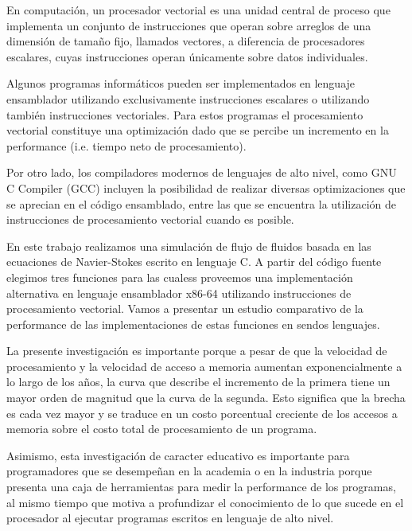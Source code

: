 En computación, un procesador vectorial es una unidad central de proceso que implementa un conjunto de instrucciones que operan sobre arreglos de una dimensión de tamaño fijo, llamados vectores, a diferencia de procesadores escalares, cuyas instrucciones operan únicamente sobre datos individuales.
\par Algunos programas informáticos pueden ser implementados en lenguaje ensamblador utilizando exclusivamente instrucciones escalares o utilizando también instrucciones vectoriales. Para estos programas el procesamiento vectorial constituye una optimización dado que se percibe un incremento en la performance (i.e. tiempo neto de procesamiento).
\par Por otro lado, los compiladores modernos de lenguajes de alto nivel, como GNU C Compiler (GCC) incluyen la posibilidad de realizar diversas optimizaciones que se aprecian en el código ensamblado, entre las que se encuentra la utilización de instrucciones de procesamiento vectorial cuando es posible.
\par En este trabajo realizamos una simulación de flujo de fluidos basada en las ecuaciones de Navier-Stokes escrito en lenguaje C. A partir del código fuente elegimos tres funciones para las cualess proveemos una implementación alternativa en lenguaje ensamblador x86-64 utilizando instrucciones de procesamiento vectorial. Vamos a presentar un estudio comparativo de la performance de las implementaciones de estas funciones en sendos lenguajes.
\par La presente investigación es importante porque a pesar de que la velocidad de procesamiento y la velocidad de acceso a memoria aumentan exponencialmente a lo largo de los años, la curva que describe el incremento de la primera tiene un mayor orden de magnitud que la curva de la segunda. Esto significa que la brecha es cada vez mayor y se traduce en un costo porcentual creciente de los accesos a memoria sobre el costo total de procesamiento de un programa.
\par Asimismo, esta investigación de caracter educativo es importante para programadores que se desempeñan en la academia o en la industria porque presenta una caja de herramientas para medir la performance de los programas, al mismo tiempo que motiva a profundizar el conocimiento de lo que sucede en el procesador al ejecutar programas escritos en lenguaje de alto nivel.